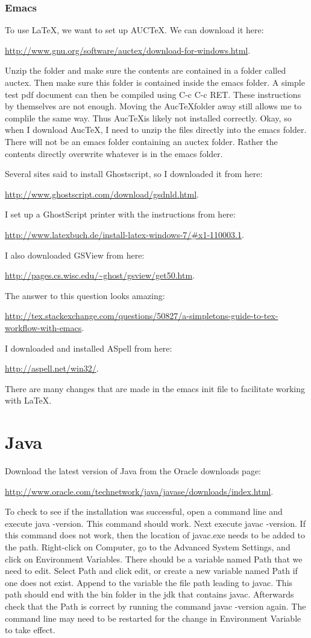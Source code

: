 \documentclass{article}
\newcommand{\web}[2]{
	\begin{center}
		\url{#1}{#2}
	\end{center}
}
\begin{document}
\subsubsection{Emacs}
\label{subsubsec:LaTeX_Emacs}

To use \LaTeX, we want to set up AUC\TeX.
We can download it here:
	\web{http://www.gnu.org/software/auctex/download-for-windows.html}.
Unzip the folder and make sure the contents are contained in a folder called auctex.
Then make sure this folder is contained inside the emacs folder.
A simple test pdf document can then be compiled using C-c C-c RET.
These instructions by themselves are not enough.
Moving the Auc\TeX folder away still allows me to complile the same way.
Thus Auc\TeX is likely not installed correctly.
Okay, so when I download Auc\TeX, I need to unzip the files directly into the emacs folder.
There will not be an emacs folder containing an auctex folder.
Rather the contents directly overwrite whatever is in the emacs folder.

Several sites said to install Ghostscript, so I downloaded it from here:
	\web{http://www.ghostscript.com/download/gsdnld.html}.
I set up a GhostScript printer with the instructions from here:
	\web{http://www.latexbuch.de/install-latex-windows-7/\#x1-110003.1}.
I also downloaded GSView from here:
	\web{http://pages.cs.wisc.edu/~ghost/gsview/get50.htm}.

The answer to this question looks amazing:
	\web{http://tex.stackexchange.com/questions/50827/a-simpletons-guide-to-tex-workflow-with-emacs}.

I downloaded and installed ASpell from here:
	\web{http://aspell.net/win32/}.

There are many changes that are made in the emacs init file to facilitate working with \LaTeX.

\section{Java}

Download the latest version of Java from the Oracle downloads page:
 	\web{http://www.oracle.com/technetwork/java/javase/downloads/index.html}.
To check to see if the installation was successful, open a command line and execute java -version.
This command should work.
Next execute javac -version.
If this command does not work, then the location of javac.exe needs to be added to the path.
Right-click on Computer, go to the Advanced System Settings, and click on Environment Variables.
There should be a variable named Path that we need to edit.
Select Path and click edit, or create a new variable named Path if one does not exist.
Append to the variable the file path leading to javac.
This path should end with the bin folder in the jdk that contains javac.
Afterwards check that the Path is correct by running the command javac -version again.
The command line may need to be restarted for the change in Environment Variable to take effect.
\end{document}
